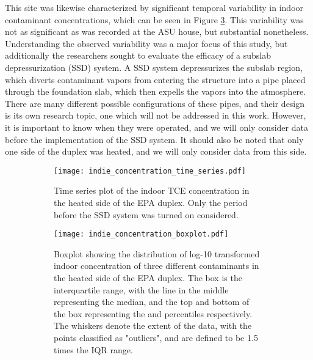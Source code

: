 This site was likewise characterized by significant temporal variability in indoor contaminant concentrations, which can be seen in Figure \ref{fig:indie_variability}.
This variability was not as significant as was recorded at the ASU house, but substantial nonetheless.
Understanding the observed variability was a major focus of this study, but additionally the researchers sought to evaluate the efficacy of a subslab depressurization (SSD) system.
A SSD system depressurizes the subslab region, which diverts contaminant vapors from entering the structure into a pipe placed through the foundation slab, which then expells the vapors into the atmosphere\cite{u.s._environmental_protection_agency_assessment_2015}.
There are many different possible configurations of these pipes, and their design is its own research topic, one which will not be addressed in this work.
However, it is important to know when they were operated, and we will only consider data before the implementation of the SSD system.
It should also be noted that only one side of the duplex was heated, and we will only consider data from this side.\par

\begin{figure}[htb!]
  \centering
  \begin{subfigure}[b]{\textwidth}
    \centering
    \texttt{[image: indie\_concentration\_time\_series.pdf]}
    \caption{Time series plot of the indoor TCE concentration in the heated side of the EPA duplex. Only the period before the SSD system was turned on considered.}
    \label{fig:indie_time_series}
  \end{subfigure}
  \begin{subfigure}[b]{\textwidth}
    \centering
    \texttt{[image: indie\_concentration\_boxplot.pdf]}
    \caption{Boxplot showing the distribution of log-10 transformed indoor concentration of three different contaminants in the heated side of the EPA duplex. The box is the interquartile range, with the line in the middle representing the median, and the top and bottom of the box representing the  and  percentiles respectively. The whiskers denote the extent of the data, with the points classified as "outliers", and are defined to be 1.5 times the IQR range.}
    \label{fig:indie_boxplot}
  \end{subfigure}
  \caption{}
  \label{fig:indie_variability}
\end{figure}

